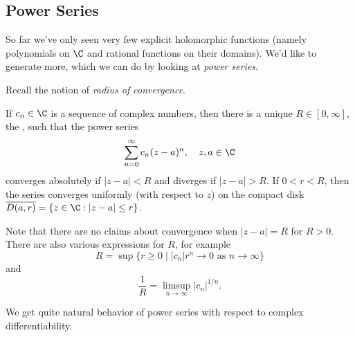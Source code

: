 \subsection{Power Series}

So far we've only seen very few explicit holomorphic functions (namely polynomials on $\C$ and rational functions on their domains). We'd like to generate more, which we can do by looking at \emph{power series}.

Recall the notion of \emph{radius of convergence}.

\begin{theorem}
    If $c_n \in \C$ is a sequence of complex numbers, then there is a unique $R \in [0, \infty]$, the , such that the power series
    $$
\sum_{n = 0}^{\infty} c_n(z - a)^n, \quad z, a \in \C
    $$
    converges absolutely if $|z - a| < R$ and diverges if $|z - a| > R$. If $0 < r < R$, then the series converges uniformly (with respect to $z$) on the compact disk $\overline{D(a, r)} = \{z \in \C : |z - a| \leq r\}$.
\end{theorem}

Note that there are no claims about convergence when $|z - a| = R$ for $R > 0$. There are also various expressions for $R$, for example
$$
R = \sup \{r \geq 0 \mid |c_n|r^n \rightarrow 0 \text{ as } n \rightarrow \infty \}
$$
and
$$
\frac{1}{R} = \limsup_{n \to \infty} |c_n|^{1/n}.
$$

We get quite natural behavior of power series with respect to complex differentiability.

